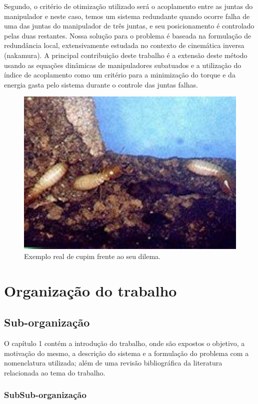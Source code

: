 Segundo, o critério de otimização utilizado será o acoplamento entre as juntas do
manipulador e neste caso, temos um sistema redundante quando ocorre falha de uma das juntas do manipulador de três juntas, e seu posicionamento é controlado pelas duas restantes. Nossa solução para o problema é baseada na formulação
de redundância local, extensivamente estudada no contexto de cinemática inversa ({nakamura}). A principal contribuição deste trabalho é a extensão deste método usando as equações dinâmicas de manipuladores subatuados e a utilização do índice de acoplamento como um critério para a minimização do torque e da energia gasta pelo sistema durante o controle das juntas falhas.

\begin{figure}[ht!]
\centering
\includegraphics[width=1\textwidth]{Cap1/cupimconcreto}
\caption{Exemplo real de cupim frente ao seu dilema.}
\label{FDII}
\end{figure}

\section{Organização do trabalho}
\subsection{Sub-organização}
O capítulo 1 contém a introdução do trabalho, onde são expostos o objetivo, a motivação do mesmo, a descrição do sistema e a formulação do problema com a nomenclatura utilizada; além de uma revisão bibliográfica da literatura relacionada ao tema do trabalho.

\subsubsection{SubSub-organização}

